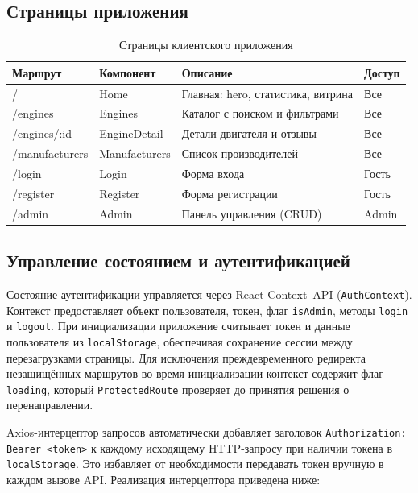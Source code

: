 \documentclass[14pt,a4paper]{extarticle}
\begin{document}
\subsection{Страницы приложения}

\begin{table}[h!]
\caption{Страницы клиентского приложения}
\begin{tabular}{|p{3cm}|p{3cm}|p{5.5cm}|p{2cm}|}
\hline
\textbf{Маршрут} & \textbf{Компонент} & \textbf{Описание} & \textbf{Доступ} \\
\hline
/              & Home          & Главная: hero, статистика, витрина & Все \\
/engines       & Engines       & Каталог с поиском и фильтрами      & Все \\
/engines/:id   & EngineDetail  & Детали двигателя и отзывы          & Все \\
/manufacturers & Manufacturers & Список производителей              & Все \\
/login         & Login         & Форма входа                        & Гость \\
/register      & Register      & Форма регистрации                  & Гость \\
/admin         & Admin         & Панель управления (CRUD)           & Admin \\
\hline
\end{tabular}
\end{table}

\subsection{Управление состоянием и аутентификацией}

Состояние аутентификации управляется через React Context~API (\texttt{AuthContext}). Контекст предоставляет объект пользователя, токен, флаг \texttt{isAdmin}, методы \texttt{login} и \texttt{logout}. При инициализации приложение считывает токен и данные пользователя из \texttt{localStorage}, обеспечивая сохранение сессии между перезагрузками страницы. Для исключения преждевременного редиректа незащищённых маршрутов во время инициализации контекст содержит флаг \texttt{loading}, который \texttt{ProtectedRoute} проверяет до принятия решения о перенаправлении.

Axios-интерцептор запросов автоматически добавляет заголовок \texttt{Authorization: Bearer <token>} к каждому исходящему HTTP-запросу при наличии токена в \texttt{localStorage}. Это избавляет от необходимости передавать токен вручную в каждом вызове API. Реализация интерцептора приведена ниже:
\end{document}

